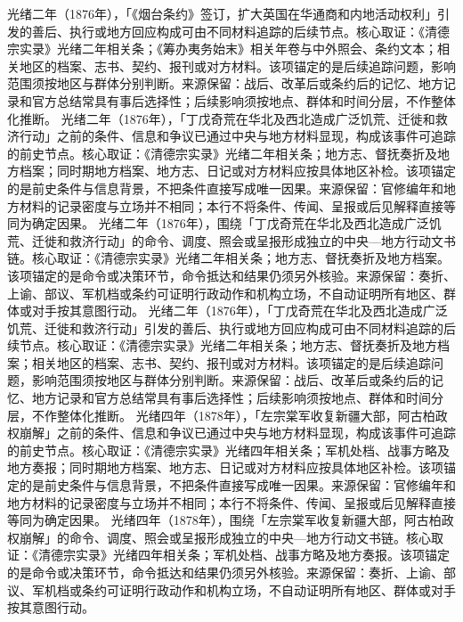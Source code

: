 光绪二年（1876年），「《烟台条约》签订，扩大英国在华通商和内地活动权利」引发的善后、执行或地方回应构成可由不同材料追踪的后续节点。核心取证：《清德宗实录》光绪二年相关条；《筹办夷务始末》相关年卷与中外照会、条约文本；相关地区的档案、志书、契约、报刊或对方材料。该项锚定的是后续追踪问题，影响范围须按地区与群体分别判断。来源保留：战后、改革后或条约后的记忆、地方记录和官方总结常具有事后选择性；后续影响须按地点、群体和时间分层，不作整体化推断。
光绪二年（1876年），「丁戊奇荒在华北及西北造成广泛饥荒、迁徙和救济行动」之前的条件、信息和争议已通过中央与地方材料显现，构成该事件可追踪的前史节点。核心取证：《清德宗实录》光绪二年相关条；地方志、督抚奏折及地方档案；同时期地方档案、地方志、日记或对方材料应按具体地区补检。该项锚定的是前史条件与信息背景，不把条件直接写成唯一因果。来源保留：官修编年和地方材料的记录密度与立场并不相同；本行不将条件、传闻、呈报或后见解释直接等同为确定因果。
光绪二年（1876年），围绕「丁戊奇荒在华北及西北造成广泛饥荒、迁徙和救济行动」的命令、调度、照会或呈报形成独立的中央—地方行动文书链。核心取证：《清德宗实录》光绪二年相关条；地方志、督抚奏折及地方档案。该项锚定的是命令或决策环节，命令抵达和结果仍须另外核验。来源保留：奏折、上谕、部议、军机档或条约可证明行政动作和机构立场，不自动证明所有地区、群体或对手按其意图行动。
光绪二年（1876年），「丁戊奇荒在华北及西北造成广泛饥荒、迁徙和救济行动」引发的善后、执行或地方回应构成可由不同材料追踪的后续节点。核心取证：《清德宗实录》光绪二年相关条；地方志、督抚奏折及地方档案；相关地区的档案、志书、契约、报刊或对方材料。该项锚定的是后续追踪问题，影响范围须按地区与群体分别判断。来源保留：战后、改革后或条约后的记忆、地方记录和官方总结常具有事后选择性；后续影响须按地点、群体和时间分层，不作整体化推断。
光绪四年（1878年），「左宗棠军收复新疆大部，阿古柏政权崩解」之前的条件、信息和争议已通过中央与地方材料显现，构成该事件可追踪的前史节点。核心取证：《清德宗实录》光绪四年相关条；军机处档、战事方略及地方奏报；同时期地方档案、地方志、日记或对方材料应按具体地区补检。该项锚定的是前史条件与信息背景，不把条件直接写成唯一因果。来源保留：官修编年和地方材料的记录密度与立场并不相同；本行不将条件、传闻、呈报或后见解释直接等同为确定因果。
光绪四年（1878年），围绕「左宗棠军收复新疆大部，阿古柏政权崩解」的命令、调度、照会或呈报形成独立的中央—地方行动文书链。核心取证：《清德宗实录》光绪四年相关条；军机处档、战事方略及地方奏报。该项锚定的是命令或决策环节，命令抵达和结果仍须另外核验。来源保留：奏折、上谕、部议、军机档或条约可证明行政动作和机构立场，不自动证明所有地区、群体或对手按其意图行动。
